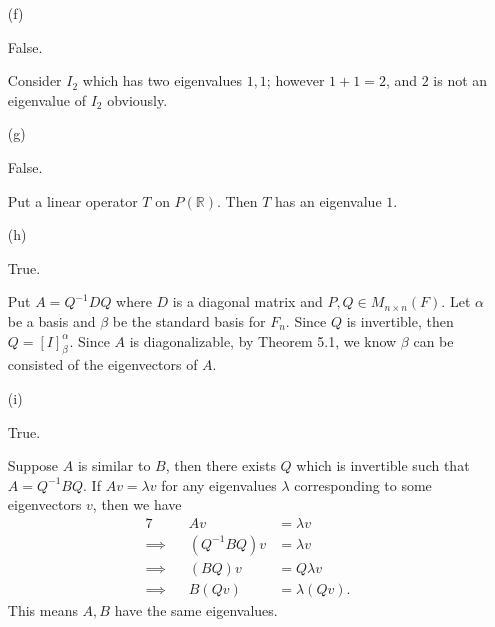 \begin{Exercise}
\begin{enumerate}[(a)]
		\item[(f)]
		\begin{answer}
			False.
		\end{answer}
		\begin{solution}
			Consider $I_2$ which has two eigenvalues $1,1$; however $1+1=2$, and $2$ is not an eigenvalue of $I_2$ obviously.
		\end{solution}
		
		\item[(g)]
		\begin{answer}
			False.
		\end{answer}
		\begin{solution}
			Put a linear operator $T$ on $P(\mathbb{R})$. Then $T$ has an eigenvalue $1$.
		\end{solution}
		
		\item[(h)]
		\begin{answer}
			True.
		\end{answer}
		\begin{solution}
			Put $A = Q^{-1} D Q$ where $D$ is a diagonal matrix and $P,Q\in M_{n\times n}(F)$. Let $\alpha$ be a basis and $\beta$ be the standard basis for $F_n$. Since $Q$ is invertible, then $Q = [I]_{\beta}^{\alpha}$. Since $A$ is diagonalizable, by Theorem 5.1, we know $\beta$ can be consisted of the eigenvectors of $A$.
		\end{solution}
		
		\item[(i)]
		\begin{answer}
			True.
		\end{answer}
		\begin{solution}
			Suppose $A$ is similar to $B$, then there exists $Q$ which is invertible such that $A = Q^{-1} B Q$. If $Av = \lambda v$ for any eigenvalues $\lambda$ corresponding to some eigenvectors $v$, then we have
			\begin{alignat*}{7}
			\quad&& Av &= \lambda v \\
			\implies&& (Q^{-1} B Q ) v &= \lambda v \\
			\implies&& (B Q)v &= Q \lambda v \\
			\implies&& B(Q v) &= \lambda (Q v).
			\end{alignat*}
			This means $A,B$ have the same eigenvalues.
		\end{solution}
		

\end{enumerate}
\end{Exercise}
